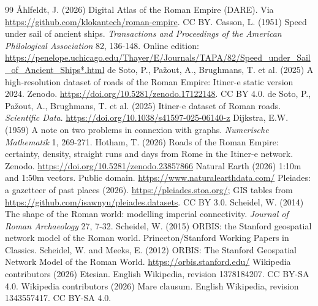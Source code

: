 \documentclass[11pt,a4paper]{article}
\begin{document}
\begin{thebibliography}{99}
 {\AA}hlfeldt, J. (2026) Digital Atlas of the Roman Empire (DARE). Via \url{https://github.com/klokantech/roman-empire}. CC BY.
 Casson, L. (1951) Speed under sail of ancient ships. \emph{Transactions and Proceedings of the American Philological Association} 82, 136-148. Online edition: \url{https://penelope.uchicago.edu/Thayer/E/Journals/TAPA/82/Speed_under_Sail_of_Ancient_Ships*.html}
 de Soto, P., Pa\v{z}out, A., Brughmans, T. et al. (2025) A high-resolution dataset of roads of the Roman Empire: Itiner-e static version 2024. Zenodo. \url{https://doi.org/10.5281/zenodo.17122148}. CC BY 4.0.
 de Soto, P., Pa\v{z}out, A., Brughmans, T. et al. (2025) Itiner-e dataset of Roman roads. \emph{Scientific Data}. \url{https://doi.org/10.1038/s41597-025-06140-z}
 Dijkstra, E.W. (1959) A note on two problems in connexion with graphs. \emph{Numerische Mathematik} 1, 269-271.
 Hotham, T. (2026) Roads of the Roman Empire: certainty, density, straight runs and days from Rome in the Itiner-e network. Zenodo. \url{https://doi.org/10.5281/zenodo.23857866}
 Natural Earth (2026) 1:10m and 1:50m vectors. Public domain. \url{https://www.naturalearthdata.com/}
 Pleiades: a gazetteer of past places (2026). \url{https://pleiades.stoa.org/}; GIS tables from \url{https://github.com/isawnyu/pleiades.datasets}. CC BY 3.0.
 Scheidel, W. (2014) The shape of the Roman world: modelling imperial connectivity. \emph{Journal of Roman Archaeology} 27, 7-32.
 Scheidel, W. (2015) ORBIS: the Stanford geospatial network model of the Roman world. Princeton/Stanford Working Papers in Classics.
 Scheidel, W. and Meeks, E. (2012) ORBIS: The Stanford Geospatial Network Model of the Roman World. \url{https://orbis.stanford.edu/}
 Wikipedia contributors (2026) Etesian. English Wikipedia, revision 1378184207. CC BY-SA 4.0.
 Wikipedia contributors (2026) Mare clausum. English Wikipedia, revision 1343557417. CC BY-SA 4.0.
\end{thebibliography}
\end{document}
